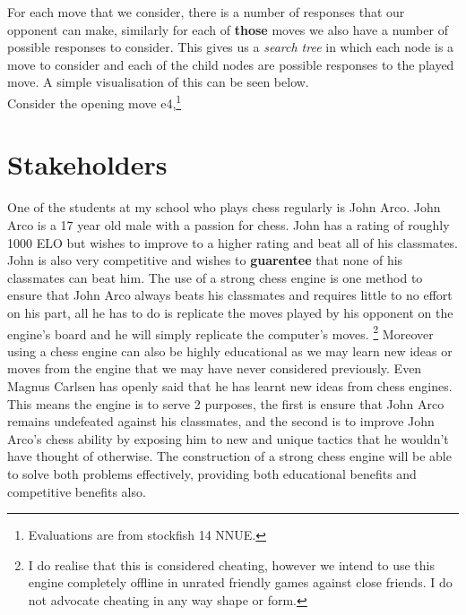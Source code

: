 For each move that we consider, there is a number of 
responses that our opponent can make, similarly for each of 
\textbf{those} moves we also have a number of possible 
responses to consider. This gives us a \textit{search tree}
in which each node is a move to consider and each of the 
child nodes are possible responses to the played move. A 
simple visualisation of this can be seen below.\\

Consider the opening move e4,\footnote{Evaluations are from
stockfish 14 NNUE.}

\begin{center}
\end{center}

\section{Stakeholders}
One of the students at my school who plays chess regularly is 
John Arco. John Arco is a 17 year old male with a passion for chess.
John has a rating of roughly 1000 ELO but wishes 
to improve to a higher rating and beat all of his 
classmates. John is also very competitive and wishes to 
\textbf{guarentee} that none of his classmates can beat him.
The use of a strong chess engine is one method to ensure
that John Arco always beats his classmates and requires little
to no effort on his part, all he has to do is replicate the 
moves played by his opponent on the engine's board and he 
will simply replicate the computer's moves. 
\footnote{I do realise that this is considered cheating,
however we intend to use this engine completely offline
in unrated friendly games against close friends. 
I do not advocate cheating in any way shape or form.}
Moreover using a chess engine can also be highly educational as
we may learn new ideas or moves from the engine that we may have
never considered previously. Even Magnus Carlsen
has openly said that he has learnt new ideas from chess engines.
\cite{lex} This means the engine is to serve 2 purposes,
the first is ensure that John Arco remains undefeated 
against his classmates, and the second is to improve John Arco's
chess ability by exposing him to new and unique tactics that 
he wouldn't have thought of otherwise. The construction of 
a strong chess engine will be able to solve both problems
effectively, providing both educational benefits and 
competitive benefits also.

